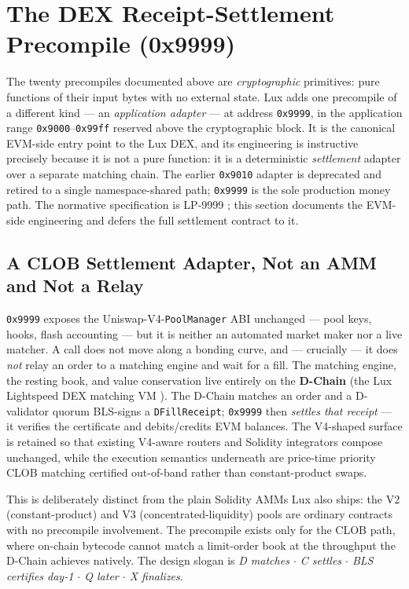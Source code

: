 \section{The DEX Receipt-Settlement Precompile (0x9999)}
\label{sec:dex-adapter}

The twenty precompiles documented above are \emph{cryptographic}
primitives: pure functions of their input bytes with no external state.
Lux adds one precompile of a different kind --- an
\emph{application adapter} --- at address \texttt{0x9999}, in the
application range \texttt{0x9000}--\texttt{0x99ff} reserved above the
cryptographic block. It is the canonical EVM-side entry point to the Lux
DEX, and its engineering is instructive precisely because it is not a
pure function: it is a deterministic \emph{settlement} adapter over a
separate matching chain. The earlier \texttt{0x9010} adapter is
deprecated and retired to a single namespace-shared path; \texttt{0x9999}
is the sole production money path. The normative specification is
LP-9999 \cite{lux-lp9999}; this section documents the EVM-side
engineering and defers the full settlement contract to it.

\subsection{A CLOB Settlement Adapter, Not an AMM and Not a Relay}

\texttt{0x9999} exposes the Uniswap-V4-\texttt{PoolManager} ABI
unchanged --- pool keys, hooks, flash accounting --- but it is neither an
automated market maker nor a live matcher. A call does not move along a
bonding curve, and --- crucially --- it does \emph{not} relay an order to
a matching engine and wait for a fill. The matching engine, the resting
book, and value conservation live entirely on the \textbf{D-Chain} (the
Lux Lightspeed DEX matching VM \cite{lux-lightspeed-dex}). The D-Chain
matches an order and a D-validator quorum BLS-signs a \texttt{DFillReceipt};
\texttt{0x9999} then \emph{settles that receipt} --- it verifies the
certificate and debits/credits EVM balances. The V4-shaped surface is
retained so that existing V4-aware routers and Solidity integrators
compose unchanged, while the execution semantics underneath are
price-time priority CLOB matching certified out-of-band rather than
constant-product swaps.

This is deliberately distinct from the plain Solidity AMMs Lux also
ships: the V2 (constant-product) and V3 (concentrated-liquidity) pools
are ordinary contracts with no precompile involvement. The precompile
exists only for the CLOB path, where on-chain bytecode cannot match a
limit-order book at the throughput the D-Chain achieves natively. The
design slogan is \emph{D matches $\cdot$ C settles $\cdot$ BLS certifies
day-1 $\cdot$ Q later $\cdot$ X finalizes}.

